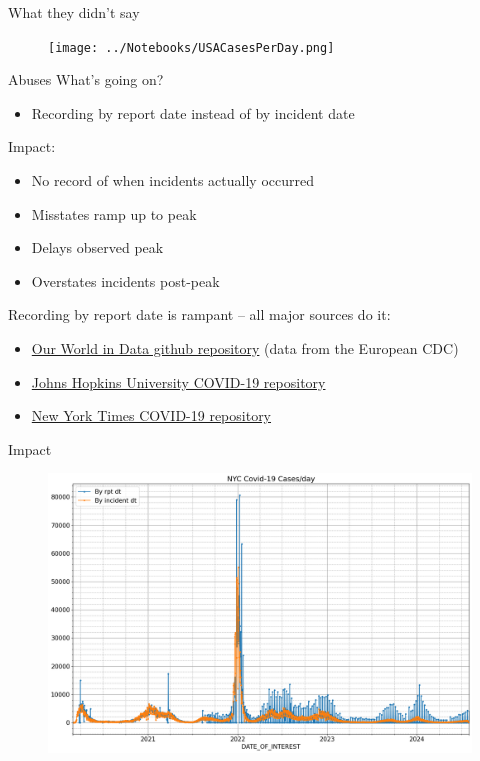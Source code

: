 \documentclass[aspectratio=169]{beamer}
\begin{document}
\begin{frame}{What they didn't say}
  \begin{figure}
    \centering
    \texttt{[image: ../Notebooks/USACasesPerDay.png]}
  \end{figure}
\end{frame}


\begin{frame}{Abuses}
  What's going on?
  \begin{itemize}
  \item Recording by report date instead of by incident date
  \end{itemize}
  
  Impact:
  \begin{itemize}
  \item No record of when incidents actually occurred
  \item Misstates ramp up to peak
  \item Delays observed peak
  \item Overstates incidents post-peak
  \end{itemize}

  Recording by report date is rampant -- all major sources do it:
  \begin{itemize}
  \item \href{https://github.com/owid/covid-19-data}{Our World in Data github
    repository} (data from the European CDC)
  \item \href{https://github.com/CSSEGISandData/COVID-19}{Johns Hopkins
    University COVID-19 repository}
  \item \href{https://github.com/nytimes/covid-19-data}{New York Times
    COVID-19 repository}
  \end{itemize}
\end{frame}

\begin{frame}{Impact}
  \begin{figure}
    \centering
    \includegraphics[height=1\textheight]{../Notebooks/casesPerDayHistoryRptDtVsInDtRaw.png}
  \end{figure}
\end{frame}
\end{document}
